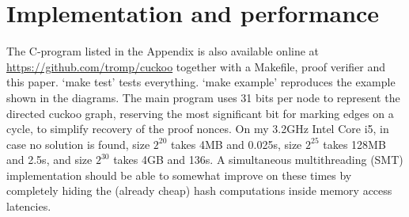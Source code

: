 \documentclass[11pt, oneside]{article}
\begin{document}
\section{Implementation and performance}
The C-program listed in the Appendix is also available online at
\url{https://github.com/tromp/cuckoo} together with a Makefile,
proof verifier and this paper. `make test' tests everything.
`make example' reproduces the example shown in the diagrams.
The main program uses 31 bits per node to represent the
directed cuckoo graph, reserving the most significant bit
for marking edges on a cycle, to simplify recovery of the proof nonces.
On my 3.2GHz Intel Core i5, in case no solution is found, size $2^{20}$ takes 4MB and 0.025s, size
$2^{25}$ takes 128MB and 2.5s, and size $2^{30}$ takes 4GB and 136s.
A simultaneous multithreading (SMT) implementation should be able to somewhat improve on these times
by completely hiding the (already cheap) hash computations inside memory access latencies.
\end{document}
